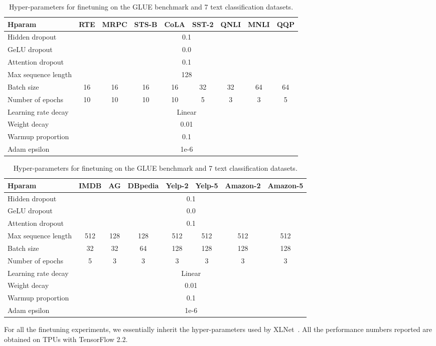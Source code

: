 \documentclass{article}
\theoremstyle{custom}
\begin{document}
\begin{table}[h!]
\centering
\begin{tabular}{lcccccccc}
	\toprule
	\bf Hparam & \bf RTE & \bf MRPC	& \bf STS-B	& \bf CoLA & \bf SST-2 & \bf QNLI &\bf MNLI & \bf QQP \\
	\midrule
	Hidden dropout
	& \multicolumn{8}{c}{0.1} \\
	GeLU dropout
	& \multicolumn{8}{c}{0.0} \\
	Attention dropout
	& \multicolumn{8}{c}{0.1} \\
	Max sequence length
	& \multicolumn{8}{c}{128}  \\
	Batch size
	& 16 & 16 & 16 & 16 & 32 & 32 & 64 & 64 \\
	Number of epochs
	& 10 & 10 & 10 & 10 &  5 &  3 &  3 &  5 \\
	Learning rate decay & \multicolumn{8}{c}{Linear} \\
	Weight decay        & \multicolumn{8}{c}{0.01}   \\
	Warmup proportion   & \multicolumn{8}{c}{0.1}   \\
	Adam epsilon        & \multicolumn{8}{c}{1e-6}   \\
	\bottomrule
\end{tabular}
\begin{tabular}{lccccccc}
	\toprule
	\bf Hparam & \bf IMDB & \bf AG & \bf DBpedia & \bf Yelp-2 & \bf Yelp-5 & \bf Amazon-2 & \bf Amazon-5 \\
	\midrule
	Hidden dropout
	& \multicolumn{7}{c}{0.1} \\
	GeLU dropout
	& \multicolumn{7}{c}{0.0} \\
	Attention dropout
	& \multicolumn{7}{c}{0.1} \\
	Max sequence length
	& 512 & 128 & 128 & 512 & 512 & 512 & 512 \\
	Batch size
	& 32 & 32 & 64 & 128 & 128 & 128 & 128 \\
	Number of epochs
	& 5 & 3 & 3 & 3 & 3 & 3 & 3 \\
	Learning rate decay & \multicolumn{7}{c}{Linear} \\
	Weight decay        & \multicolumn{7}{c}{0.01}   \\
	Warmup proportion   & \multicolumn{7}{c}{0.1}   \\
	Adam epsilon        & \multicolumn{7}{c}{1e-6}   \\
	\bottomrule
\end{tabular}
\caption{Hyper-parameters for finetuning on the GLUE benchmark and 7 text classification datasets.}
\label{tab:hp-finetune-glue-textcls}
\end{table}
For all the finetuning experiments, we essentially inherit the hyper-parameters used by XLNet~\cite{yang2019xlnet}.
All the performance numbers reported are obtained on TPUs with TensorFlow 2.2.
\end{document}
